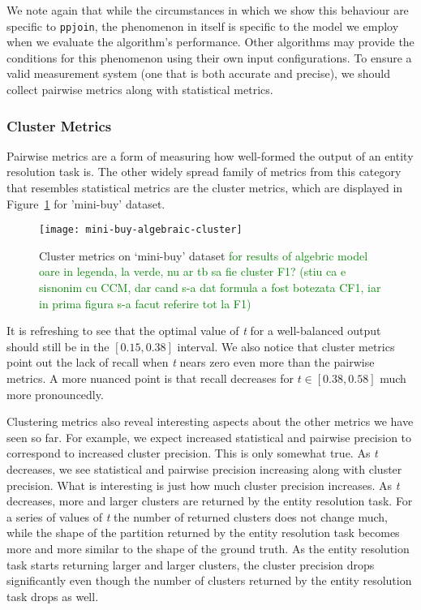 We note again that while the circumstances in which we show this behaviour are
specific to \texttt{ppjoin}, the phenomenon in itself is specific to the model
we employ when we evaluate the algorithm's performance.
Other algorithms may provide the conditions for this phenomenon using their own
input configurations.
To ensure a valid measurement system (one that is both accurate and precise), we
should collect pairwise metrics along with statistical metrics.

\subsubsection{Cluster Metrics}

Pairwise metrics are a form of measuring how well-formed the output of an entity
resolution task is.
The other widely spread family of metrics from this category that resembles
statistical metrics are the cluster metrics, which are displayed in
Figure~\ref{fig:mini-alg-cluster} for 'mini-buy' dataset.

\begin{figure}[!h]
    \centering
    \captionsetup{justification=centering}
    \texttt{[image: mini-buy-algebraic-cluster]}
    \caption{Cluster metrics on `mini-buy' dataset 
    \textcolor{green}{for results of algebric model}\\
    \textcolor{green}{oare in legenda, la verde, nu ar tb sa fie cluster F1? (stiu ca e sisnonim cu CCM, dar cand s-a dat formula a fost botezata CF1, iar in prima figura s-a facut referire tot la F1)}
    }
    \label{fig:mini-alg-cluster}
\end{figure}

It is refreshing to see that the optimal value of \textit{t} for a well-balanced
output should still be in the $\left[0.15,0.38\right]$ interval.
We also notice that cluster metrics point out the lack of recall when \textit{t}
nears zero even more than the pairwise metrics.
A more nuanced point is that recall decreases for $t \in \left[0.38,0.58\right]$
much more pronouncedly.

Clustering metrics also reveal interesting aspects about the other metrics we have
seen so far.
For example, we expect increased statistical and pairwise precision to
correspond to increased cluster precision.
This is only somewhat true.
As \textit{t} decreases, we see statistical and pairwise precision increasing
along with cluster precision.
What is interesting is just how much cluster precision increases.
As \textit{t} decreases, more and larger clusters are returned by the entity
resolution task.
For a series of values of \textit{t} the number of returned clusters does not
change much, while the shape of the partition returned by the entity resolution
task becomes more and more similar to the shape of the ground truth.
As the entity resolution task starts returning larger and larger clusters, the
cluster precision drops significantly even though the number of clusters
returned by the entity resolution task drops as well.

